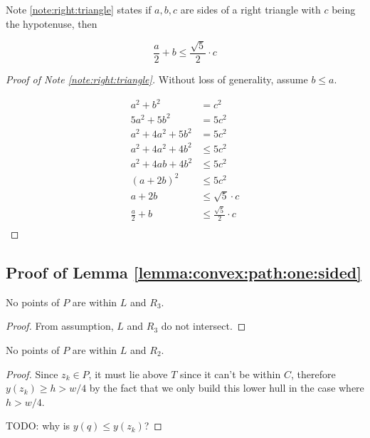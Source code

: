 \documentclass{tufte-handout}
\begin{document}
Note \ref{note:right:triangle} states if $a,b,c$ are sides of a right
triangle with $c$ being the hypotenuse, then

\begin{displaymath}
  \frac{a}{2} + b \le \frac{\sqrt{5}}{2} \cdot c
\end{displaymath}

\begin{proof}[Proof of Note \ref{note:right:triangle}]
  Without loss of generality, assume $b \le a$.
  
  \begin{align*}
    a^2 + b^2 &= c^2 \\
    5a^2 + 5b^2 &= 5c^2 \\
    a^2 + 4a^2 + 5b^2 &= 5c^2 \\
    a^2 + 4a^2 + 4b^2 &\le 5c^2 \\
    a^2 + 4ab + 4b^2 &\le 5c^2 \\
    (a + 2b)^2 &\le 5c^2 \\
    a + 2b &\le \sqrt{5} \cdot c \\
    \frac{a}{2} + b &\le \frac{\sqrt{5}}{2} \cdot c \\
  \end{align*}
\end{proof}

\subsection{Proof of Lemma \ref{lemma:convex:path:one:sided}}

\begin{Note}

  No points of $P$ are within $L$ and $R_3$.
  
\end{Note}

\begin{proof}
  
  From assumption, $L$ and $R_3$ do not intersect.

\end{proof}

\begin{Note}

  No points of $P$ are within $L$ and $R_2$.
  
\end{Note}

\begin{proof}

  Since $z_k \in P$, it must lie above $T$ since it can't be within $C$,
  therefore $y(z_k) \ge h > w/4$ by the fact that we only build this
  lower hull in the case where $h > w/4$.

  TODO: why is $y(q) \le y(z_k)$?

\end{proof}
\end{document}
